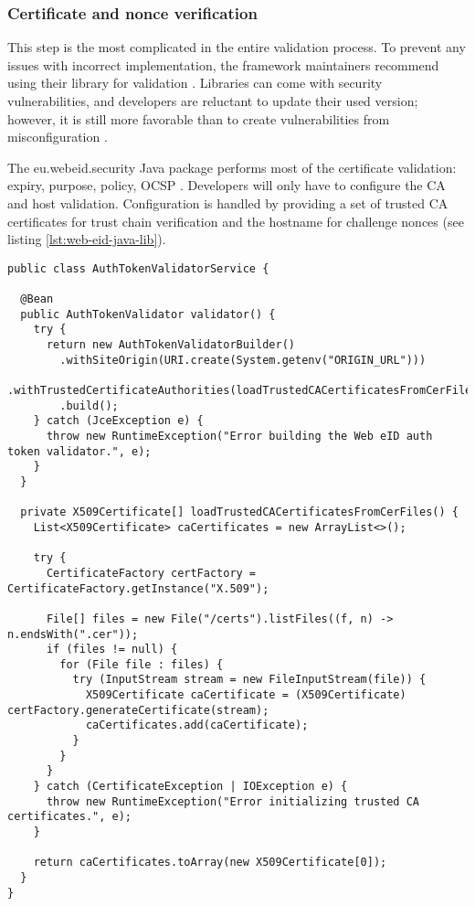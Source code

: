 \subsubsection{Certificate and nonce verification}

This step is the most complicated in the entire validation process. To prevent any issues with incorrect implementation, the framework maintainers recommend using their library for validation \cite{ria-webeid-source-web-eid-authtoken-validation-java-readme}. Libraries can come with security vulnerabilities, and developers are reluctant to update their used version; however, it is still more favorable than to create vulnerabilities from misconfiguration \cite{9240619}.

The eu.webeid.security Java package performs most of the certificate validation: expiry, purpose, policy, OCSP \cite{ria-webeid-source-web-eid-authtoken-validation-java-readme}. Developers will only have to configure the CA and host validation. Configuration is handled by providing a set of trusted CA certificates for trust chain verification and the hostname for challenge nonces (see listing \ref{lst:web-eid-java-lib}).

\begin{lstlisting}[caption={Web eID Login Endpoint}, label={lst:web-eid-java-lib}]
public class AuthTokenValidatorService {

  @Bean
  public AuthTokenValidator validator() {
    try {
      return new AuthTokenValidatorBuilder()
        .withSiteOrigin(URI.create(System.getenv("ORIGIN_URL")))
        .withTrustedCertificateAuthorities(loadTrustedCACertificatesFromCerFiles())
        .build();
    } catch (JceException e) {
      throw new RuntimeException("Error building the Web eID auth token validator.", e);
    }
  }

  private X509Certificate[] loadTrustedCACertificatesFromCerFiles() {
    List<X509Certificate> caCertificates = new ArrayList<>();

    try {
      CertificateFactory certFactory = CertificateFactory.getInstance("X.509");

      File[] files = new File("/certs").listFiles((f, n) -> n.endsWith(".cer"));
      if (files != null) {
        for (File file : files) {
          try (InputStream stream = new FileInputStream(file)) {
            X509Certificate caCertificate = (X509Certificate) certFactory.generateCertificate(stream);
            caCertificates.add(caCertificate);
          }
        }
      }
    } catch (CertificateException | IOException e) {
      throw new RuntimeException("Error initializing trusted CA certificates.", e);
    }

    return caCertificates.toArray(new X509Certificate[0]);
  }
}
\end{lstlisting}

